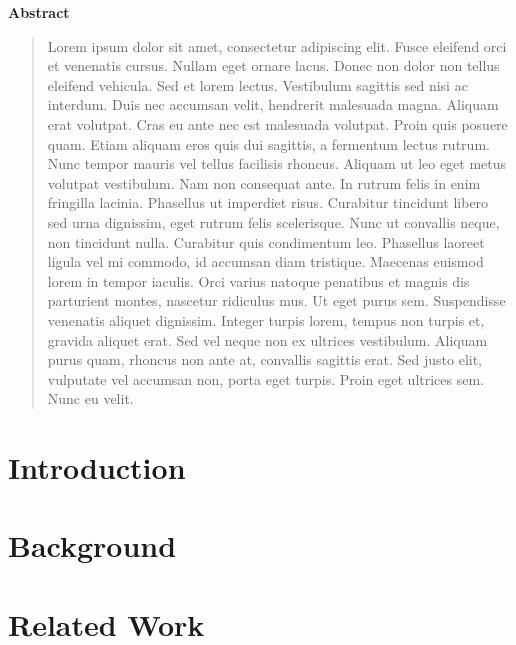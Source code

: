 \documentclass[12pt]{scrbook}
\newcommand{\abstractname}{Abstract}
\newenvironment{abstract}{
    \begin{center}
    \bfseries \abstractname
    \end{center}
    \begin{quote}
}{
    \end{quote}
}
\begin{document}
\begin{abstract}
    Lorem ipsum dolor sit amet, consectetur adipiscing elit. Fusce eleifend orci
    et venenatis cursus. Nullam eget ornare lacus. Donec non dolor non tellus
    eleifend vehicula. Sed et lorem lectus. Vestibulum sagittis sed nisi ac interdum.
    Duis nec accumsan velit, hendrerit malesuada magna. Aliquam erat volutpat.
    Cras eu ante nec est malesuada volutpat. Proin quis posuere quam. Etiam aliquam
    eros quis dui sagittis, a fermentum lectus rutrum. Nunc tempor mauris vel tellus
    facilisis rhoncus. Aliquam ut leo eget metus volutpat vestibulum.
    Nam non consequat ante. In rutrum felis in enim fringilla lacinia.
    Phasellus ut imperdiet risus. Curabitur tincidunt libero sed urna dignissim,
    eget rutrum felis scelerisque. Nunc ut convallis neque, non tincidunt nulla.
    Curabitur quis condimentum leo. Phasellus laoreet ligula vel mi commodo, id
    accumsan diam tristique. Maecenas euismod lorem in tempor iaculis.
    Orci varius natoque penatibus et magnis dis parturient montes, nascetur
    ridiculus mus. Ut eget purus sem. Suspendisse venenatis aliquet dignissim.
    Integer turpis lorem, tempus non turpis et, gravida aliquet erat. Sed vel
    neque non ex ultrices vestibulum. Aliquam purus quam, rhoncus non ante at,
    convallis sagittis erat. Sed justo elit, vulputate vel accumsan non, porta eget
    turpis. Proin eget ultrices sem. Nunc eu velit.
\end{abstract}
\thispagestyle{empty}

\tableofcontents


\chapter{Introduction}


\chapter{Background}


\chapter{Related Work}



\printbibliography
\end{document}
